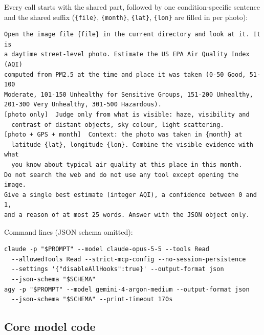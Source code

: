 \documentclass[conference]{IEEEtran}
\begin{document}
Every call starts with the shared part, followed by one condition-specific
sentence and the shared suffix (\texttt{\{file\}}, \texttt{\{month\}},
\texttt{\{lat\}}, \texttt{\{lon\}} are filled in per photo):
\begin{lstlisting}
Open the image file {file} in the current directory and look at it. It is
a daytime street-level photo. Estimate the US EPA Air Quality Index (AQI)
computed from PM2.5 at the time and place it was taken (0-50 Good, 51-100
Moderate, 101-150 Unhealthy for Sensitive Groups, 151-200 Unhealthy,
201-300 Very Unhealthy, 301-500 Hazardous).
[photo only]  Judge only from what is visible: haze, visibility and
  contrast of distant objects, sky colour, light scattering.
[photo + GPS + month]  Context: the photo was taken in {month} at
  latitude {lat}, longitude {lon}. Combine the visible evidence with what
  you know about typical air quality at this place in this month.
Do not search the web and do not use any tool except opening the image.
Give a single best estimate (integer AQI), a confidence between 0 and 1,
and a reason of at most 25 words. Answer with the JSON object only.
\end{lstlisting}
Command lines (JSON schema omitted):
\begin{lstlisting}
claude -p "$PROMPT" --model claude-opus-5-5 --tools Read
  --allowedTools Read --strict-mcp-config --no-session-persistence
  --settings '{"disableAllHooks":true}' --output-format json
  --json-schema "$SCHEMA"
agy -p "$PROMPT" --model gemini-4-argon-medium --output-format json
  --json-schema "$SCHEMA" --print-timeout 170s
\end{lstlisting}

\subsection{Core model code}
\end{document}
